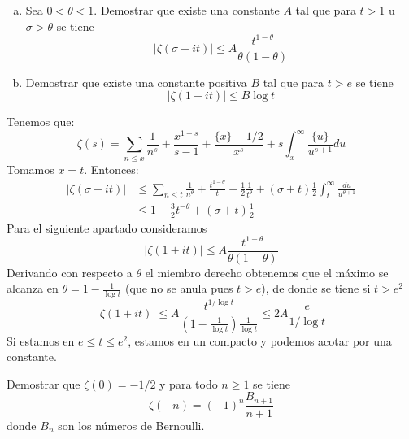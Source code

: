 \documentclass[twoside]{article}
\begin{document}
\newpage
\begin{ejercicio}{7}\mbox{}
\begin{enumerate}[(a)]
\item Sea $0<θ<1$. Demostrar que existe una constante $A$ tal que para $t>1$ u $σ>θ$ se tiene
$$
|ζ(σ +it)|\leq A\frac{t^{1-\theta}}{\theta(1-\theta)}
$$
\item Demostrar que existe una constante positiva $B$ tal que para $t>e$ se tiene
$$
|ζ(1+it)|≤ B\log t
$$
\end{enumerate}
\end{ejercicio}
\begin{solucion}
Tenemos que:
\[ ζ(s) = \sum_{n≤x} \frac{1}{n^s} + \frac{x^{1-s}}{s-1} + \frac{\{x\}-1/2}{x^s}+s \int_x^{∞} \frac{\{u\}}{u^{s+1}} du \]
Tomamos $x=t$. Entonces:
\begin{align*}
 |ζ(σ+it)| &≤ \sum_{n≤t} \frac{1}{n^θ} + \frac{t^{1-θ}}{t} + \frac{1}{2} \frac{1}{t^θ} + (σ+t)\frac{1}{2} \int_t^{∞} \frac{du}{u^{θ+1}} \\
 &\leq 1 + \frac{3}{2}t^{-\theta} + (σ+t)\frac{1}{2} 
\end{align*}
Para el siguiente apartado consideramos
\[|\zeta(1+it)| \leq A\frac{t^{1-\theta}}{\theta(1-\theta)}\]
Derivando con respecto a $\theta$ el miembro derecho obtenemos que el máximo se alcanza en $\theta=1-\frac{1}{\log t}$ (que no se anula pues $t>e$), de donde se tiene si $t>e^2$
$$
|\zeta(1+it)| \leq A \frac{t^{1/\log t}}{(1-\frac{1}{\log t})\frac{1}{\log t}}\leq 2A \frac{e}{1/\log t}
$$
Si estamos en $e\leq t\leq e^2$, estamos en un compacto y podemos acotar por una constante.
\end{solucion}
\newpage
\begin{ejercicio}{8}
Demostrar que $ζ(0) = -1/2$ y para todo $n≥1$ se tiene
\[ ζ(-n) = (-1)^n \frac{B_{n+1}}{n+1} \]
donde $B_n$ son los números de Bernoulli.
\end{ejercicio}
\end{document}
